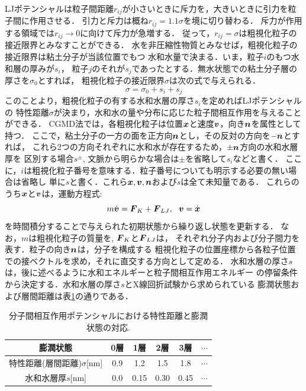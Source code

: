 LJポテンシャルは粒子間距離$r_{ij}$が小さいときに斥力を，大きいときに引力を粒子間に作用させる．
引力と斥力は概ね$r_{ij}=1.1\sigma$を境に切り替わる．
斥力が作用する領域では$r_{ij}\rightarrow 0$に向けて斥力が急増する．
従って，$r_{ij}=\sigma$は粗視化粒子の接近限界とみなすことができる．
水を非圧縮性物質とみなせば，粗視化粒子の接近限界は粘土分子が当該位置でもつ
水和水量で決まる．いま，粒子$i$のもつ水和層の厚みが$s_i$，
粒子$j$のそれが$s_j$であったとする．無水状態での粘土分子層の厚さを$\sigma_0$とすれば，
粗視化粒子の接近限界$\sigma$は次の式で与えられる．
\begin{equation}
	\sigma=\sigma_0 +s_i+s_j
	\label{eqn:}
\end{equation}
このことより，粗視化粒子の有する水和水層の厚さ$s_i$を定めればLJポテンシャルの
特性距離$\sigma$が決まり，水和水の量や分布に応じた粒子間相互作用を与えることができる．
CGMD法では，各粗視化粒子は位置$\mbox{\boldmath $x$}$と速度$\mbox{\boldmath $v$}$，向き$\mbox{\boldmath $n$}$を属性として持つ．
ここで，粘土分子の一方の面を正方向$\mbox{\boldmath $n$}$とし，その反対の方向を$-\mbox{\boldmath $n$}$とすれば，
これら2つの方向それぞれに水和水が存在するため，$\pm\mbox{\boldmath $n$}$方向の水和水層厚を
区別する場合$s^\pm$, 文脈から明らかな場合は$\pm$を省略して$s_i$などと書く．
ここに，$i$は粗視化粒子番号を意味する．粒子番号についても明示する必要の無い場合は省略し
単に$s$と書く．これら$\mbox{\boldmath $x$},\mbox{\boldmath $v$},\mbox{\boldmath $n$}$および$s$は全て未知量である．
これらのうち$\mbox{\boldmath $x$}$と$\mbox{\boldmath $v$}$は，運動方程式:
\begin{equation}
	m\dot{ \fat{v}}=\fat{F}_K+\fat{F}_{LJ}, \ \ \fat{v}=\dot{\fat{x}}
	\label{eqn:eq_motion}
\end{equation}
を時間積分することで与えられた初期状態から繰り返し状態を更新する．
なお，$m$は粗視化粒子の質量を, $\mbox{\boldmath $F$}_K$と$\mbox{\boldmath $F$}_{LJ}$は，
それぞれ分子内および分子間力を表す．粒子の向き$\mbox{\boldmath $n$}$は，分子を構成する
粗視化粒子の位置座標から各粒子位置での接ベクトルを求め，それに直交する方向として定める．
水和水層の厚さ$s$は，後に述べるように水和エネルギーと粒子間相互作用エネルギー
の停留条件から決定する．水和水層の厚さ$s$とX線回折試験から求められている
膨潤状態および層間距離は表\ref{tbl:tbl_sig}の通りである．
\begin{table}[h]
	\begin{center}
	\caption{分子間相互作用ポテンシャルにおける特性距離と膨潤状態の対応.}
	\vspace{3mm}
	\begin{tabular}{c||c|c|c|c|c}
		膨潤状態 & 0層 & 1層 & 2層 & 3層 & $\cdots$\\
		\hline
		特性距離(層間距離)$\sigma$[{\rm nm}]& 0.9 & 1.2 & 1.5 & 1.8 & $\cdots$ \\
		\hline
		水和水層厚$s$[{\rm nm}] & 0.0 & 0.15 & 0.30 & 0.45 & $\cdots$
	\end{tabular}
	\label{tbl:tbl_sig}
	\end{center}
\end{table}

